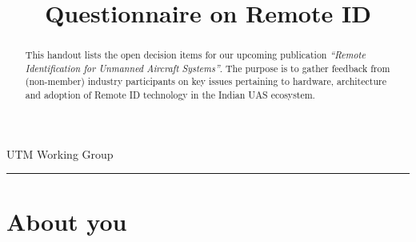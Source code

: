 \documentclass{ua_wgs_questionnaire}
\title{Questionnaire on Remote ID}
\begin{document}
\maketitle
UTM Working Group
\begin{abstract}
This handout lists the open decision items for our upcoming publication
\emph{``Remote Identification for Unmanned Aircraft Systems''}.
The purpose is to gather feedback from (non-member) industry participants
on key issues pertaining to hardware, architecture and adoption of
Remote ID technology in the Indian UAS ecosystem. 
\end{abstract}
\begin{fullwidth}
\rule[0.5ex]{0.78\paperwidth}{1pt}
\end{fullwidth}

\section*{About you}
\end{document}
